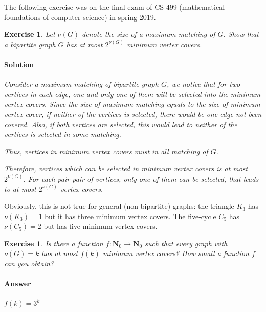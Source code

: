 \documentclass[12pt,a4]{article}
\newtheorem{exercise}[theorem]{Exercise}
\begin{document}
The following exercise was on the final exam of CS 499 (mathematical foundations of computer science) in spring 2019.
\begin{exercise}
    Let $\nu(G)$ denote the size of a maximum matching of $G$. Show that a bipartite graph $G$
    has at most $2^{\nu(G)}$ minimum vertex covers.

\paragraph{Solution}
Consider a maximum matching of bipartite graph $G$, we notice that for two vertices in each edge, one and only one of them will be selected into the minimum vertex covers. Since the size of maximum matching equals to the size of minimum vertex cover, if neither of the vertices is selected, there would be one edge not been covered. Also, if both vertices are selected, this would lead to neither of the vertices is selected in some matching.

Thus, vertices in minimum vertex covers must in all matching of $G$.

Therefore, vertices which can be selected in minimum vertex covers is at most $2^{\nu(G)}$. For each pair pair of vertices, only one of them can be selected, that leads to at most $2^{\nu(G)}$ vertex covers.
    
\end{exercise}


Obviously, this is not  true for general (non-bipartite) graphs: the triangle $K_3$ has $\nu(K_3) = 1$ but it has 
three minimum vertex covers. The five-cycle $C_5$ has $\nu(C_5) = 2$ but has five minimum vertex covers.

\begin{exercise}
   Is there a function $f: \mathbf{N}_0 \rightarrow \mathbf{N}_0$ such that every graph with $\nu(G) = k$ has 
   at most $f(k)$ minimum vertex covers? How small a function $f$ can you obtain?
\end{exercise}

\paragraph{Answer}$f(k)=3^k$
\end{document}
